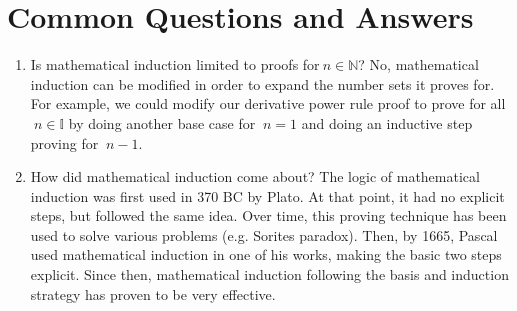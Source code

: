 \documentclass[11pt]{article}
\newtheorem*{General Definition}{General Definition}
\theoremstyle{definition}
\begin{document}
\section*{Common Questions and Answers}
	\begin{enumerate}	
		\item Is mathematical induction limited to proofs for$\ n \in \mathbb{N}$?
		\newline No, mathematical induction can be modified in order to expand the number sets it proves for. For example, we could modify our derivative power rule proof to prove for all $\ n \in \mathbb{I}$ by doing another base case for $\ n = 1$ and doing an inductive step proving for $\ n-1$.
		\item How did mathematical induction come about?
		\newline The logic of mathematical induction was first used in 370 BC by Plato. At that point, it had no explicit steps, but followed the same idea. Over time, this proving technique has been used to solve various problems (e.g. Sorites paradox). Then, by 1665, Pascal used mathematical induction in one of his works, making the basic two steps explicit. Since then, mathematical induction following the basis and induction strategy has proven to be very effective.
	\end{enumerate}

 		

%
%
\end{document}
